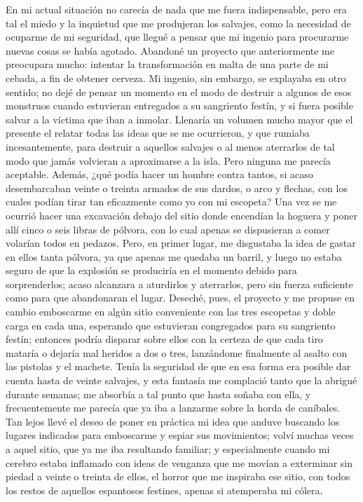 \documentclass{novela}
\begin{document}
    En mi actual situación no carecía de nada que me fuera indispensable, pero era tal el miedo y la inquietud que me produjeran los salvajes, como la necesidad de ocuparme de mi seguridad, que llegué a pensar que mi ingenio para procurarme nuevas cosas se había agotado. Abandoné un proyecto que anteriormente me preocupara mucho: intentar la transformación en malta de una parte de mi cebada, a fin de obtener cerveza.
    Mi ingenio, sin embargo, se explayaba en otro sentido; no dejé de pensar un momento en el modo de destruir a algunos de esos monstruos cuando estuvieran entregados a su sangriento festín, y si fuera posible salvar a la víctima que iban a inmolar. Llenaría un volumen mucho mayor que el presente el relatar todas las ideas que se me ocurrieron, y que rumiaba incesantemente, para destruir a aquellos salvajes o al menos aterrarlos de tal modo que jamás volvieran a aproximarse a la isla. Pero ninguna me parecía aceptable. Además, ¿qué podía hacer un hombre contra tantos, si acaso desembarcaban veinte o treinta armados de sus dardos, o arco y flechas, con los cuales podían tirar tan eficazmente como yo con mi escopeta?
    Una vez se me ocurrió hacer una excavación debajo del sitio donde encendían la hoguera y poner allí cinco o seis libras de pólvora, con lo cual apenas se dispusieran a comer volarían todos en pedazos. Pero, en primer lugar, me disgustaba la idea de gastar en ellos tanta pólvora, ya que apenas me quedaba un barril, y luego no estaba seguro de que la explosión se produciría en el momento debido para sorprenderlos; acaso alcanzara a aturdirlos y aterrarlos, pero sin fuerza suficiente como para que abandonaran el lugar.
    Deseché, pues, el proyecto y me propuse en cambio emboscarme en algún sitio conveniente con las tres escopetas y doble carga en cada una, esperando que estuvieran congregados para su sangriento festín; entonces podría disparar sobre ellos con la certeza de que cada tiro mataría o dejaría mal heridos a dos o tres, lanzándome finalmente al asalto con las pistolas y el machete. Tenía la seguridad de que en esa forma era posible dar cuenta hasta de veinte salvajes, y esta fantasía me complació tanto que la abrigué durante semanas; me absorbía a tal punto que hasta soñaba con ella, y frecuentemente me parecía que ya iba a lanzarme sobre la horda de caníbales.
    Tan lejos llevé el deseo de poner en práctica mi idea que anduve buscando los lugares indicados para emboscarme y espiar sus movimientos; volví muchas veces a aquel sitio, que ya me iba resultando familiar; y especialmente cuando mi cerebro estaba inflamado con ideas de venganza que me movían a exterminar sin piedad a veinte o treinta de ellos, el horror que me inspiraba ese sitio, con todos los restos de aquellos espantosos festines, apenas si atemperaba mi cólera.
\end{document}
